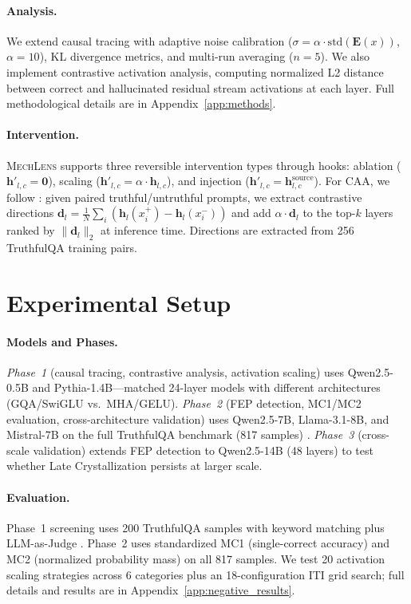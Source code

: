 \documentclass[11pt]{article}
\newcommand{\mechlens}{\textsc{MechLens}}
\newcommand{\caa}{\textsc{CAA}}
\begin{document}
\paragraph{Analysis.} We extend causal tracing \citep{meng2022locating} with adaptive noise calibration ($\sigma = \alpha \cdot \text{std}(\mathbf{E}(x))$, $\alpha{=}10$), KL divergence metrics, and multi-run averaging ($n{=}5$). We also implement contrastive activation analysis, computing normalized L2 distance between correct and hallucinated residual stream activations at each layer. Full methodological details are in Appendix~\ref{app:methods}.

\paragraph{Intervention.} \mechlens{} supports three reversible intervention types through hooks: ablation ($\mathbf{h}'_{l,c} = \mathbf{0}$), scaling ($\mathbf{h}'_{l,c} = \alpha \cdot \mathbf{h}_{l,c}$), and injection ($\mathbf{h}'_{l,c} = \mathbf{h}^{\text{source}}_{l,c}$). For \caa{}, we follow \citet{turner2023activation}: given paired truthful/untruthful prompts, we extract contrastive directions $\mathbf{d}_l = \frac{1}{N}\sum_i(\mathbf{h}_l(x^+_i) - \mathbf{h}_l(x^-_i))$ and add $\alpha \cdot \mathbf{d}_l$ to the top-$k$ layers ranked by $\|\mathbf{d}_l\|_2$ at inference time. Directions are extracted from 256 TruthfulQA training pairs.

\section{Experimental Setup}
\label{sec:setup}

\paragraph{Models and Phases.} \emph{Phase~1} (causal tracing, contrastive analysis, activation scaling) uses Qwen2.5-0.5B and Pythia-1.4B---matched 24-layer models with different architectures (GQA/SwiGLU vs.\ MHA/GELU). \emph{Phase~2} (FEP detection, MC1/MC2 evaluation, cross-architecture validation) uses Qwen2.5-7B, Llama-3.1-8B, and Mistral-7B on the full TruthfulQA benchmark (817 samples) \citep{lin2022truthfulqa}. \emph{Phase~3} (cross-scale validation) extends FEP detection to Qwen2.5-14B (48 layers) to test whether Late Crystallization persists at larger scale.

\paragraph{Evaluation.} Phase~1 screening uses 200 TruthfulQA samples with keyword matching plus LLM-as-Judge \citep{zheng2024judging}. Phase~2 uses standardized MC1 (single-correct accuracy) and MC2 (normalized probability mass) on all 817 samples. We test 20 activation scaling strategies across 6 categories plus an 18-configuration ITI grid search; full details and results are in Appendix~\ref{app:negative_results}.
\end{document}
